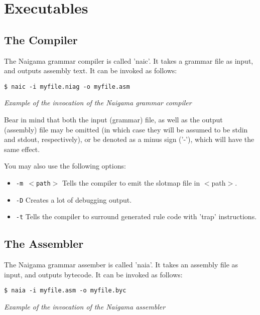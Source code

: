 \section{Executables}

\subsection{The Compiler}

The Naigama grammar compiler is called 'naic'.
It takes a grammar file as input, and outputs assembly text.
It can be invoked as follows:

\begin{myquote}
\begin{verbatim}
$ naic -i myfile.niag -o myfile.asm

\end{verbatim}
\end{myquote}
\textit{Example of the invocation of the Naigama grammar compiler}

Bear in mind that both the input (grammar) file, as well as the
output (assembly) file may be omitted (in which case they will be
assumed to be stdin and stdout, respectively), or be denoted as
a minus sign ('-'), which will have the same effect.

You may also use the following options:

\begin{itemize}
\item \texttt{-m $<$path$>$} Tells the compiler to emit the slotmap
      file in $<$path$>$.
\item \texttt{-D} Creates a lot of debugging output.
\item \texttt{-t} Tells the compiler to surround generated rule
      code with 'trap' instructions.
\end{itemize}

\subsection{The Assembler}

The Naigama grammar assember is called 'naia'.
It takes an assembly file as input, and outputs bytecode.
It can be invoked as follows:

\begin{myquote}
\begin{verbatim}
$ naia -i myfile.asm -o myfile.byc

\end{verbatim}
\end{myquote}
\textit{Example of the invocation of the Naigama assembler}

